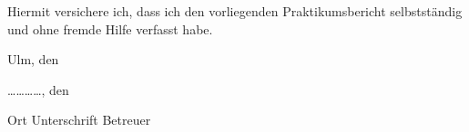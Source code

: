 %
%

\thispagestyle{empty}


\vspace{1cm}

Hiermit versichere ich, dass ich den vorliegenden Praktikumsbericht selbstständig und ohne fremde Hilfe verfasst habe.\vspace{1cm}

Ulm, den \dotfill

\hspace{10cm} {\footnotesize \fullname}

\vspace{1cm}


\vspace{1cm}

\dots \dots \dots \dots, den \dotfill

{\footnotesize Ort} \hspace{9cm} {\footnotesize Unterschrift Betreuer}

